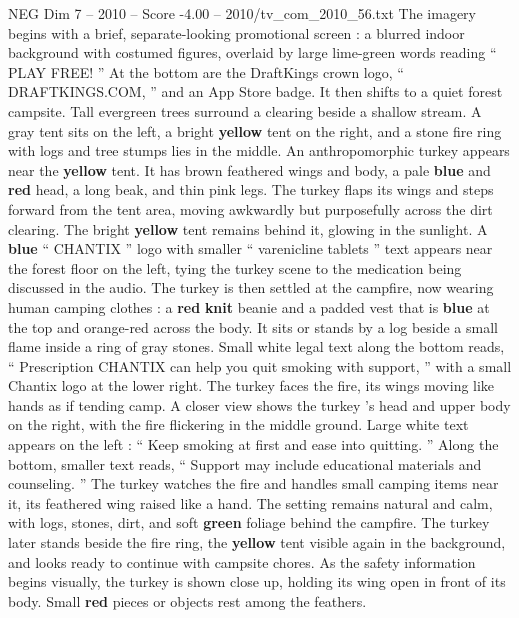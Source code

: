 \begin{textsample}{NEG Dim 7 – 2010 – Score -4.00 – 2010/tv\_com\_2010\_56.txt}  \label{ex:f7_neg_045}
The imagery begins with a brief, separate-looking promotional screen : a blurred indoor background with costumed figures, overlaid by large lime-green words reading “ PLAY FREE! ” At the bottom are the DraftKings crown logo, “ DRAFTKINGS.COM, ” and an App Store badge.
It then shifts to a quiet forest campsite.
Tall evergreen trees surround a clearing beside a shallow stream.
A gray tent sits on the left, a bright \textbf{yellow} tent on the right, and a stone fire ring with logs and tree stumps lies in the middle.
An anthropomorphic turkey appears near the \textbf{yellow} tent.
It has brown feathered wings and body, a pale \textbf{blue} and \textbf{red} head, a long beak, and thin pink legs.
The turkey flaps its wings and steps forward from the tent area, moving awkwardly but purposefully across the dirt clearing.
The bright \textbf{yellow} tent remains behind it, glowing in the sunlight.
A \textbf{blue} “ CHANTIX ” logo with smaller “ varenicline tablets ” text appears near the forest floor on the left, tying the turkey scene to the medication being discussed in the audio.
The turkey is then settled at the campfire, now wearing human camping clothes : a \textbf{red} \textbf{knit} beanie and a padded vest that is \textbf{blue} at the top and orange-red across the body.
It sits or stands by a log beside a small flame inside a ring of gray stones.
Small white legal text along the bottom reads, “ Prescription CHANTIX can help you quit smoking with support, ” with a small Chantix logo at the lower right.
The turkey faces the fire, its wings moving like hands as if tending camp.
A closer view shows the turkey ’s head and upper body on the right, with the fire flickering in the middle ground.
Large white text appears on the left : “ Keep smoking at first and ease into quitting. ” Along the bottom, smaller text reads, “ Support may include educational materials and counseling. ” The turkey watches the fire and handles small camping items near it, its feathered wing raised like a hand.
The setting remains natural and calm, with logs, stones, dirt, and soft \textbf{green} foliage behind the campfire.
The turkey later stands beside the fire ring, the \textbf{yellow} tent visible again in the background, and looks ready to continue with campsite chores.
As the safety information begins visually, the turkey is shown close up, holding its wing open in front of its body.
Small \textbf{red} pieces or objects rest among the feathers.

\end{textsample}
